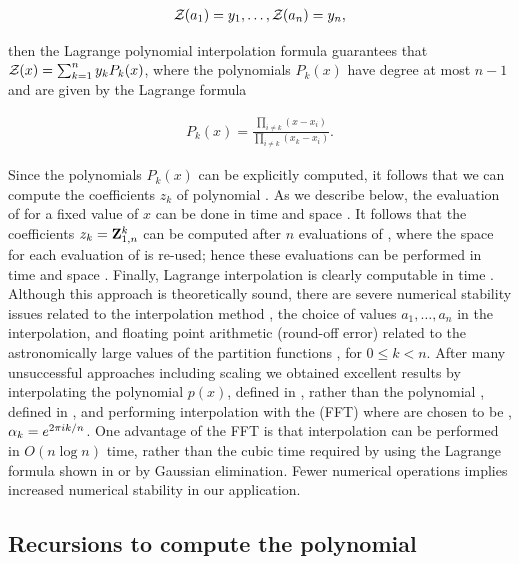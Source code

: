 \begin{align}
\label{eq:fftbor:solutionsForAlpha}
\emZof{}{a_1} = y_1, \dots, \emZof{}{a_n} = y_n,
\end{align}

then the Lagrange polynomial interpolation formula guarantees that
${\mathcal Z}_{}(x) = \sum_{k=1}^n y_k P_k(x)$, where the polynomials $P_k(x)$ have degree
at most $n-1$ and are given by the Lagrange formula

\begin{align}
\label{eq:fftbor:lagrangeInterpolation}
P_k(x) = \frac{\prod_{i\ne k} (x-x_i)}{\prod_{i \ne k} (x_k-x_i)}.
\end{align}

Since the polynomials $P_k(x)$ can be explicitly computed, it follows that
we can compute the coefficients $z_k$ of polynomial \fullZx. As we describe
below, the evaluation of \fullZx for a fixed value of $x$ can be done in
time  and space .  It follows that the coefficients
$z_k={\bf Z}^{k}_{1,n}$ can be computed after
$n$ evaluations of \fullZx, where the space for each evaluation of \fullZx
is re-used; hence these evaluations can be performed in time  and space
. Finally,
Lagrange interpolation is clearly computable in time .
Although this approach is theoretically sound, there are severe
numerical stability issues related to the interpolation method
\citep{highambarycentricinterpolation},
the choice of values $a_1,\dots,a_{n}$ in the interpolation,
and floating point arithmetic (round-off error) related to the
astronomically large values of the partition functions
, for $0 \leq k < n$. After many unsuccessful
approaches including scaling we obtained excellent results by
interpolating the polynomial $p(x)$, defined in ,
rather than the polynomial \fullZx, defined in ,
and performing interpolation with the \fft (FFT) \citep{cormen}
where \alphaN are
chosen to be \nRoUs,
$\alpha_k = e^{2 \pi i k/n}$.
One
advantage of the FFT is that interpolation can be performed in $O(n \log n)$
time, rather than the cubic time required by using the Lagrange formula
shown in  or by Gaussian elimination. Fewer
numerical operations implies increased numerical stability in our application.

\subsection{Recursions to compute the polynomial
\texorpdfstring{}{}}
\label{subsec:fftbor:polynomial}

